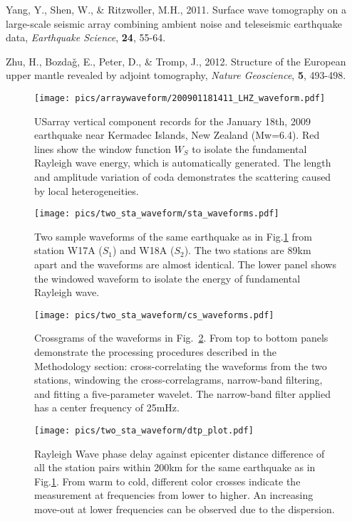 \documentclass[referee]{gji}
\begin{document}
{{\begin{thebibliography}{}
	   Yang, Y., Shen, W., \& Ritzwoller, M.H., 2011. Surface wave tomography on a large-scale seismic array combining ambient noise and teleseismic earthquake data, \textit{Earthquake Science}, \textbf{24}, 55-64.

	   Zhu, H., Bozda\v{g}, E., Peter, D., \& Tromp, J., 2012. Structure of the European upper mantle revealed by adjoint tomography, \textit{Nature Geoscience}, \textbf{5}, 493-498.

\end{thebibliography}

\begin{figure}
	\texttt{[image: pics/arraywaveform/200901181411\_LHZ\_waveform.pdf]}	
	\caption{USarray vertical component records for the January 18th, 2009 earthquake near Kermadec Islands, New Zealand (Mw=6.4). Red lines show the window function $W_S$ to isolate the fundamental Rayleigh wave energy, which is automatically generated. The length and amplitude variation of coda demonstrates the scattering caused by local heterogeneities.}
	\label{fig:arraywaveform}
\end{figure}

\begin{figure}
	\texttt{[image: pics/two\_sta\_waveform/sta\_waveforms.pdf]}
	\caption{Two sample waveforms of the same earthquake as in Fig.\ref{fig:arraywaveform} from station W17A ($S_1$) and W18A ($S_2$). The two stations are 89km apart and the waveforms are almost identical. The lower panel shows the windowed waveform to isolate the energy of fundamental Rayleigh wave.}
	\label{fig:twostawaveform}
\end{figure}

\begin{figure}
	\texttt{[image: pics/two\_sta\_waveform/cs\_waveforms.pdf]}
	\caption{Crossgrams of the waveforms in Fig.~\ref{fig:twostawaveform}. From top to bottom panels demonstrate the processing procedures described in the Methodology section: cross-correlating the waveforms from the two stations, windowing the cross-correlagrams, narrow-band filtering, and fitting a five-parameter wavelet. The narrow-band filter applied has a center frequency of 25mHz.}
	\label{fig:cswaveform}
\end{figure}

\begin{figure}
	\texttt{[image: pics/two\_sta\_waveform/dtp\_plot.pdf]}
	\caption{Rayleigh Wave phase delay against epicenter distance difference of all the station pairs within 200km for the same earthquake as in Fig.\ref{fig:arraywaveform}. From warm to cold, different color crosses indicate the measurement at frequencies from lower to higher. An increasing move-out at lower frequencies can be observed due to the dispersion. }
	\label{fig:dtp}
\end{figure}

}}
\end{document}
